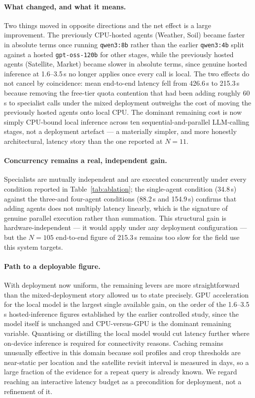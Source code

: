 \documentclass[preprint,12pt]{elsarticle}
\begin{document}
\paragraph{What changed, and what it means.} Two things moved in
opposite directions and the net effect is a large improvement. The
previously CPU-hosted agents (Weather, Soil) became faster in absolute
terms once running \texttt{qwen3:8b} rather than the earlier
\texttt{qwen3:4b} split against a hosted \texttt{gpt-oss-120b} for other
stages, while the previously hosted agents (Satellite, Market) became
slower in absolute terms, since genuine hosted inference at 1.6--3.5\,s
no longer applies once every call is local. The two effects do not
cancel by coincidence: mean end-to-end latency fell from 426.6\,s to
215.3\,s because removing the free-tier quota contention that had been
adding roughly 60\,s to specialist calls under the mixed deployment
outweighs the cost of moving the previously hosted agents onto local
CPU. The dominant remaining cost is now simply CPU-bound local
inference across ten sequential-and-parallel LLM-calling stages, not a
deployment artefact --- a materially simpler, and more honestly
architectural, latency story than the one reported at $N=11$.

\paragraph{Concurrency remains a real, independent gain.} Specialists
are mutually independent and are executed concurrently under every
condition reported in Table~\ref{tab:ablation}; the single-agent
condition (34.8\,s) against the three-and four-agent conditions (88.2\,s
and 154.9\,s) confirms that adding agents does not multiply latency
linearly, which is the signature of genuine parallel execution rather
than summation. This structural gain is hardware-independent --- it
would apply under any deployment configuration --- but the $N=105$
end-to-end figure of 215.3\,s remains too slow for the field use this
system targets.

\paragraph{Path to a deployable figure.} With deployment now uniform,
the remaining levers are more straightforward than the mixed-deployment
story allowed us to state precisely. GPU acceleration for the local
model is the largest single available gain, on the order of the
1.6--3.5\,s hosted-inference figures established by the earlier
controlled study, since the model itself is unchanged and CPU-versus-GPU
is the dominant remaining variable. Quantising or distilling the local
model would cut latency further where on-device inference is required
for connectivity reasons. Caching remains unusually effective in this
domain because soil profiles and crop thresholds are near-static per
location and the satellite revisit interval is measured in days, so a
large fraction of the evidence for a repeat query is already known. We
regard reaching an interactive latency budget as a precondition for
deployment, not a refinement of it.
\end{document}
